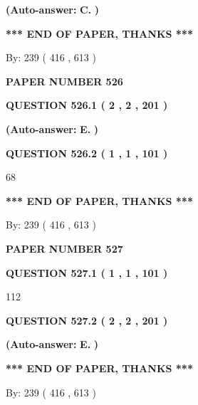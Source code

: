 \documentclass[12pt]{article}
\begin{document}
 
{\textbf{(Auto-answer:}}
{\textbf{\large{
C.}}}
{\textbf{)}}
 
 
   
   
   
   
\vspace{1.0in} 
{\textbf{\large{ *** END OF PAPER, THANKS *** }}} 
   
   
\hspace{1.0in} By: 
 239 ( 416 ,  613 )
   
   
   
   
\newpage 
\setcounter{page}{ 
   526001 } 
   
   
 {\textbf{ \Large{ PAPER NUMBER  526  }}}
   
   
   
   
  
  
{\textbf{\large{QUESTION
526.1 
 ( 2 , 2 , 201 )
}}}
 
 
{\textbf{(Auto-answer:}}
{\textbf{\large{
E.}}}
{\textbf{)}}
 
 
  
  
{\textbf{\large{QUESTION
526.2 
 ( 1 , 1 , 101 )
}}}

68
   
   
   
   
\vspace{1.0in} 
{\textbf{\large{ *** END OF PAPER, THANKS *** }}} 
   
   
\hspace{1.0in} By: 
 239 ( 416 ,  613 )
   
   
   
   
\newpage 
\setcounter{page}{ 
   527001 } 
   
   
 {\textbf{ \Large{ PAPER NUMBER  527  }}}
   
   
   
   
  
  
{\textbf{\large{QUESTION
527.1 
 ( 1 , 1 , 101 )
}}}

112
  
  
{\textbf{\large{QUESTION
527.2 
 ( 2 , 2 , 201 )
}}}
 
 
{\textbf{(Auto-answer:}}
{\textbf{\large{
E.}}}
{\textbf{)}}
 
 
   
   
   
   
\vspace{1.0in} 
{\textbf{\large{ *** END OF PAPER, THANKS *** }}} 
   
   
\hspace{1.0in} By: 
 239 ( 416 ,  613 )
   
   
   
\end{document}
